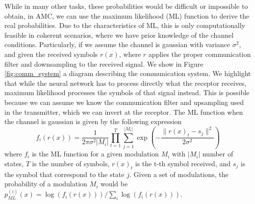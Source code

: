 \documentclass[conference]{IEEEtran}
\begin{document}
While in many other tasks, these probabilities would be difficult or impossible to obtain, in AMC, we can use the maximum likelihood (ML) function to derive the real probabilities. Due to the characteristics of ML, this is only computationally feasible in coherent scenarios, where we have prior knowledge of the channel conditions. Particularly, if we assume the channel is gaussian with variance $\sigma^{2}$, and given the received symbols $r(x)$, where $r$ applies the proper communication filter and downsampling to the received signal. We show in Figure \ref{fig:comm_system} a diagram describing the communication system. We highlight that while the neural network has to process directly what the receptor receives, maximum likelihood processes the symbols of that signal instead. This is possible because we can assume we know the communication filter and upsampling used in the transmitter, which we can invert at the receptor. The ML function when the channel is gaussian is given by the following expression
\begin{equation}
	f_{i}(r(x)) = \dfrac{1}{2\pi \sigma^{2}|M_i|}\prod_{t=1}^{T} \sum_{j=1}^{|M_i|} \exp\left(-\dfrac{\lVert r(x)_t - s_j\rVert^{2}}{2 \sigma^{2}}\right)
\label{eq:ml}
\end{equation}
where $f_{i}$ is the ML function for a given modulation $M_i$ with $|M_i|$ number of states, $T$ is the number of symbols, $r(x)_t$ is the t-th symbol received, and $s_j$ is the symbol that correspond to the state $j$. Given a set of modulations, the probability of a modulation $M_i$ would be $p_{ML}^{(i)}(x) = \log(f_{i}(r(x))) / \sum_i \log(f_{i}(r(x)))$.
\end{document}
